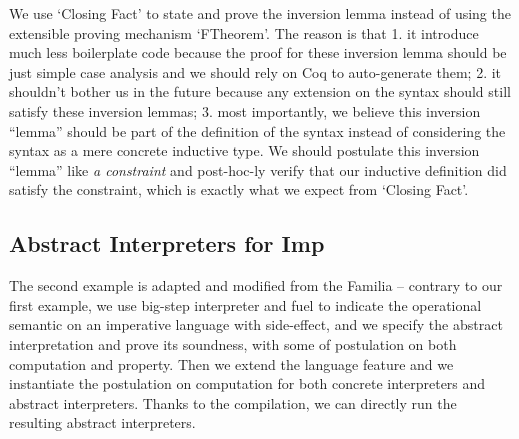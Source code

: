 We use `Closing Fact' to state and prove the inversion lemma instead of using the extensible proving mechanism `FTheorem'. The reason is that 1. it introduce much less boilerplate code because the proof for these inversion lemma should be just simple case analysis and we should rely on Coq to auto-generate them; 2. it shouldn't bother us in the future because any extension on the syntax should still satisfy these inversion lemmas; 3. most importantly, we believe this inversion ``lemma'' should be part of the definition of the syntax instead of considering the syntax as a mere concrete inductive type. We should postulate this inversion ``lemma'' like \textit{a constraint} and post-hoc-ly verify that our inductive definition did satisfy the constraint, which is exactly what we expect from `Closing Fact'.

\subsection{Abstract Interpreters for Imp}
The second example is adapted and modified from the Familia\citep{zhang2017familia}
-- contrary to our first example, we use big-step interpreter and fuel to indicate the operational semantic on an imperative language with side-effect, and we specify the abstract interpretation and prove its soundness, with some of postulation on both computation and property. Then we extend the language feature and we instantiate the postulation on computation for both concrete interpreters and abstract interpreters. Thanks to the compilation, we can directly run the resulting abstract interpreters.